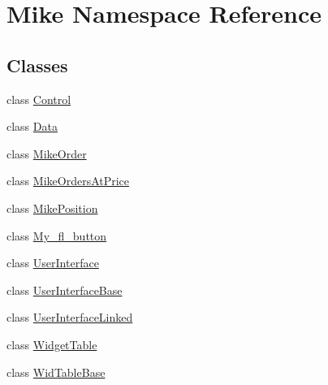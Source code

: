 \hypertarget{namespace_mike}{}\section{Mike Namespace Reference}
\label{namespace_mike}
\subsection*{Classes}
\begin{DoxyCompactItemize}
\item 
class \hyperlink{class_mike_1_1_control}{Control}
\item 
class \hyperlink{class_mike_1_1_data}{Data}
\item 
class \hyperlink{class_mike_1_1_mike_order}{Mike\+Order}
\item 
class \hyperlink{class_mike_1_1_mike_orders_at_price}{Mike\+Orders\+At\+Price}
\item 
class \hyperlink{class_mike_1_1_mike_position}{Mike\+Position}
\item 
class \hyperlink{class_mike_1_1_my__fl__button}{My\+\_\+fl\+\_\+button}
\item 
class \hyperlink{class_mike_1_1_user_interface}{User\+Interface}
\item 
class \hyperlink{class_mike_1_1_user_interface_base}{User\+Interface\+Base}
\item 
class \hyperlink{class_mike_1_1_user_interface_linked}{User\+Interface\+Linked}
\item 
class \hyperlink{class_mike_1_1_widget_table}{Widget\+Table}
\item 
class \hyperlink{class_mike_1_1_wid_table_base}{Wid\+Table\+Base}
\end{DoxyCompactItemize}
